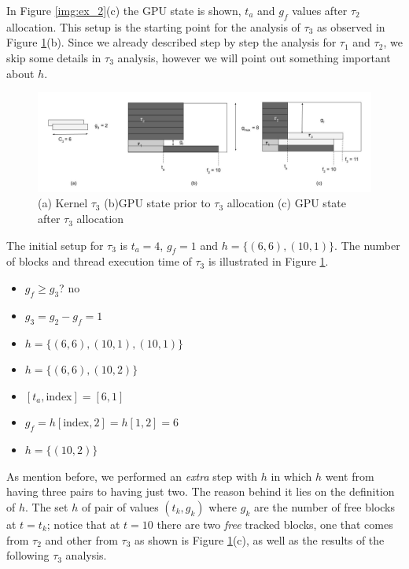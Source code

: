 \documentclass[
  12pt,
  a4paperpaper,
]{report}
\providecommand{\tightlist}{%
  \setlength{\itemsep}{0pt}\setlength{\parskip}{0pt}}
\begin{document}
In Figure \ref{img:ex_2}(c) the GPU state is shown, \(t_a\) and \(g_f\)
values after \(\tau_2\) allocation. This setup is the starting point for
the analysis of \(\tau_3\) as observed in Figure \ref{img:ex_3}(b).
Since we already described step by step the analysis for \(\tau_1\) and
\(\tau_2\), we skip some details in \(\tau_3\) analysis, however we will
point out something important about \(h\).

\begin{figure}
\centering
\includegraphics{source/figures/ex_3.jpg}
\caption{(a) Kernel \(\tau_3\) (b)GPU state prior to \(\tau_3\)
allocation (c) GPU state after \(\tau_3\) allocation \label{img:ex_3}}
\end{figure}

The initial setup for \(\tau_3\) is \(t_a = 4\), \(g_f= 1\) and
\(h = \{ (6,6),(10,1) \}\). The number of blocks and thread execution
time of \(\tau_3\) is illustrated in Figure \ref{img:ex_3}.

\begin{itemize}
\tightlist
\item
  \(g_f \geq g_3\)? no
\item
  \(g_3 = g_2 - g_f = 1\)
\item
  \(h = \{ (6,6), (10,1), (10,1) \}\)
\item
  \(h = \{ (6,6), (10,2) \}\)
\item
  \([ t_a, \mathrm{index} ] = [6,1]\)
\item
  \(g_f = h[ \mathrm{index},2] = h[1,2] = 6\)
\item
  \(h = \{(10,2)\}\)
\end{itemize}

As mention before, we performed an \emph{extra} step with \(h\) in which
\(h\) went from having three pairs to having just two. The reason behind
it lies on the definition of \(h\). The set \(h\) of pair of values
\((t_k, g_k)\) where \(g_k\) are the number of free blocks at \(t=t_k\);
notice that at \(t=10\) there are two \emph{free} tracked blocks, one
that comes from \(\tau_2\) and other from \(\tau_3\) as shown is Figure
\ref{img:ex_3}(c), as well as the results of the following \(\tau_3\)
analysis.
\end{document}
